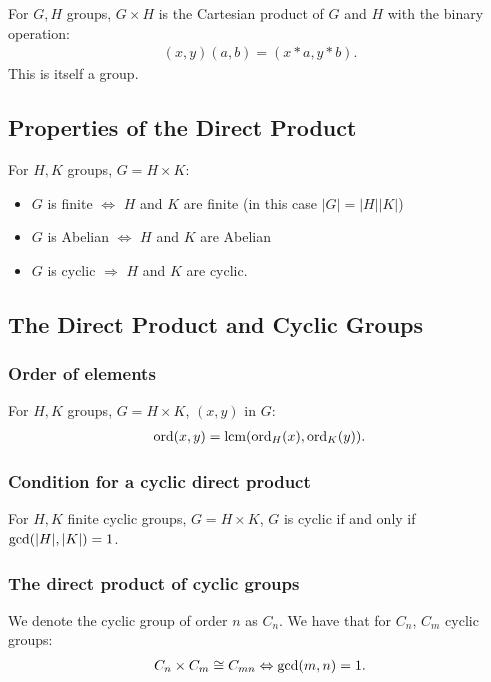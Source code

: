 \documentclass[a4paper, 12pt, twoside]{article}
\begin{document}
For $G, H$ groups, $G \times H$ is the Cartesian product of $G$ and
$H$ with the binary operation:
\begin{align*}
      (x, y)(a, b) = (x * a, y * b). \tag{$\forall x, a \in G, y, b \in H$}
\end{align*}
This is itself a group.

\subsection{Properties of the Direct Product}

For $H, K$ groups, $G = H \times K$:

\begin{itemize}
      \item $G$ is finite $\Leftrightarrow$ $H$ and $K$ are finite
            (in this case $|G| = |H||K|$)
      \item $G$ is Abelian $\Leftrightarrow$ $H$ and $K$ are Abelian
      \item $G$ is cyclic $\Rightarrow$ $H$ and $K$ are cyclic.
\end{itemize}

\subsection{The Direct Product and Cyclic Groups}

\subsubsection{Order of elements}

For $H, K$ groups, $G = H \times K$, $(x, y)$ in $G$:
\begin{align*}
      \operatorname{ord}(x, y) = \operatorname{lcm}(\operatorname{ord}_H(x), \operatorname{ord}_K(y)).
\end{align*}

\subsubsection{Condition for a cyclic direct product}

For $H, K$ finite cyclic groups, $G = H \times K$, $G$ is cyclic if and only if
$\operatorname{gcd}(|H|, |K|) = 1$.

\subsubsection{The direct product of cyclic groups}

We denote the cyclic group of order $n$ as $C_n$. We have that
for $C_n$, $C_m$ cyclic groups:
\begin{align*}
      C_n \times C_m \cong C_{mn} \Leftrightarrow \operatorname{gcd}(m, n) = 1.
\end{align*}
\end{document}
